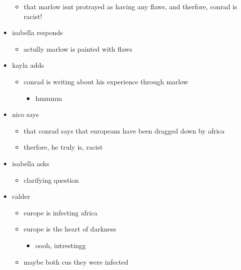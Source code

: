 \documentclass[letterpaper]{article}
\begin{document}
\begin{itemize}
\begin{itemize}
\item that marlow isnt protrayed as having any flaws, and therfore, conrad
is racist!
\end{itemize}

\item isabella responds

\begin{itemize}
\item actully marlow is painted with flaws
\end{itemize}

\item kayla adds

\begin{itemize}
\item conrad is writing about his experience through marlow

\begin{itemize}
\item hmmmm
\end{itemize}
\end{itemize}

\item nico says

\begin{itemize}
\item that conrad says that europeans have been dragged down by africa
\item therfore, he truly is, racist
\end{itemize}

\item isabella asks

\begin{itemize}
\item clarifying question
\end{itemize}

\item calder

\begin{itemize}
\item europe is infecting africa
\item europe is the heart of darkness

\begin{itemize}
\item oooh, intrestingg
\end{itemize}

\item maybe both cus they were infected
\end{itemize}
\end{itemize}
\end{document}
